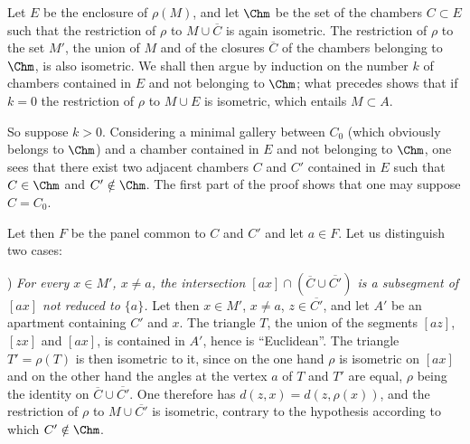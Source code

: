 \documentclass[12pt,a4paper,oneside,english]{smfart}
\makeatletter
\newcommand{\btpageanchor}[1]{\Hy@raisedlink{\hypertarget{p:#1}{}}}
\newcommand{\btpage}[1]{\marginnote{p.~#1}\btpageanchor{#1}}
\newcommand{\pagemark}[1]{\btpage{#1}}
\theoremstyle{definition}
\theoremstyle{bt}
\makeatother
\begin{document}
Let $E$ be the enclosure of $\rho(M)$, and let $\Chm$ be the set of the
chambers $C\subset E$ such that the restriction of $\rho$ to
$M\cup\overline{C}$ is again isometric. The restriction of $\rho$ to the set
$M'$, the union of $M$ and of the closures $\overline{C}$ of the chambers
belonging to $\Chm$, is also isometric. We shall then argue by induction on
the number $k$ of chambers contained in $E$ and not belonging to $\Chm$; what
precedes shows that if $k=0$ the restriction of $\rho$ to $M\cup E$ is
isometric, which entails $M\subset A$.

So suppose $k>0$. Considering a minimal gallery between $C_0$ (which
obviously belongs to $\Chm$) and a chamber contained in $E$ and not belonging
to $\Chm$, one sees that there exist two adjacent chambers $C$ and $C'$
contained in $E$ such that $C\in\Chm$ and $C'\notin\Chm$. The first part of
the proof shows that one may suppose $C=C_0$.

Let then $F$ be the panel common to $C$ and $C'$ and let $a\in F$. Let us
distinguish two cases:

\smallskip{}) \emph{For every $x\in M'$, $x\neq a$, the intersection
$[ax]\cap(\overline{C}\cup\overline{C'})$ is a subsegment of $[ax]$ not
reduced to $\{a\}$.} Let then $x\in M'$, $x\neq a$, $z\in\overline{C'}$, and
let $A'$ be an apartment containing $C'$ and $x$. The triangle $T$, the union
of the segments $[az]$, $[zx]$ and $[ax]$, is contained in $A'$, hence is
``Euclidean''. The triangle $T'=\rho(T)$ is then isometric to it, since on the
one hand $\rho$ is
\pagemark{52}
isometric on $[ax]$ and on the other hand the angles at the vertex $a$ of $T$
and $T'$ are equal, $\rho$ being the identity on
$\overline{C}\cup\overline{C'}$. One therefore has $d(z,x)=d(z,\rho(x))$, and
the restriction of $\rho$ to $M\cup\overline{C'}$ is isometric, contrary to
the hypothesis according to which $C'\notin\Chm$.
\end{document}
